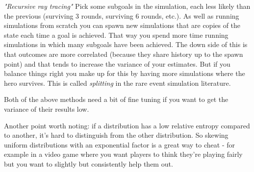 \documentclass[12pt]{article}
\begin{document}
\emph{"Recursive ray tracing"} Pick some subgoals in the simulation, each less likely than the previous (surviving 3 rounds, surviving 6 rounds, etc.). As well as running simulations from scratch you can spawn new simulations that are copies of the state each time a goal is achieved. That way you spend more time running simulations in which many subgoals have been achieved. The down side of this is that outcomes are more correlated (because they share history up to the spawn point) and that tends to increase the variance of your estimates. But if you balance things right you make up for this by having more simulations where the hero survives. This is called \emph{splitting} in the rare event simulation literature.

Both of the above methods need a bit of fine tuning if you want to get the variance of their results low.

Another point worth noting: if a distribution has a low relative entropy compared to another, it's hard to distinguish from the other distribution.
So skewing uniform distributions with an exponential factor is a great way to cheat - for example in a video game where you want players to think they're playing fairly but you want to slightly but consistently help them out.
\end{document}
